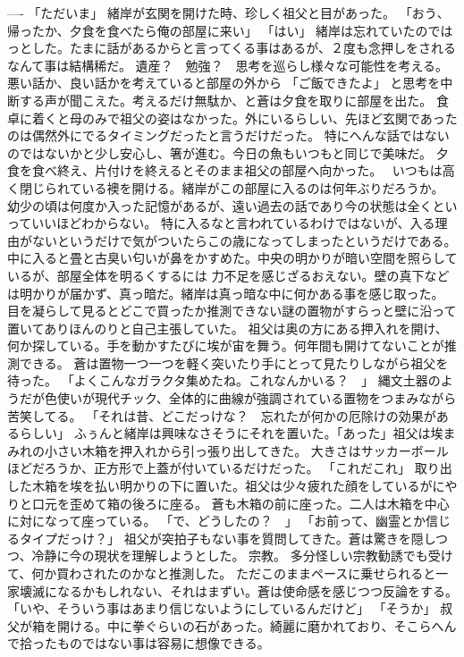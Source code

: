 \documentclass[uplatex]{utbook}
\begin{document}
----
「ただいま」
緒岸が玄関を開けた時、珍しく祖父と目があった。
「おう、帰ったか、夕食を食べたら俺の部屋に来い」
「はい」
緒岸は忘れていたのではっとした。たまに話があるからと言ってくる事はあるが、２度も念押しをされるなんて事は結構稀だ。
遺産？　勉強？　思考を巡らし様々な可能性を考える。悪い話か、良い話かを考えていると部屋の外から
「ご飯できたよ」
と思考を中断する声が聞こえた。考えるだけ無駄か、と蒼は夕食を取りに部屋を出た。
食卓に着くと母のみで祖父の姿はなかった。外にいるらしい、先ほど玄関であったのは偶然外にでるタイミングだったと言うだけだった。
特にへんな話ではないのではないかと少し安心し、箸が進む。今日の魚もいつもと同じで美味だ。
夕食を食べ終え、片付けを終えるとそのまま祖父の部屋へ向かった。　
いつもは高く閉じられている襖を開ける。緒岸がこの部屋に入るのは何年ぶりだろうか。
幼少の頃は何度か入った記憶があるが、遠い過去の話であり今の状態は全くといっていいほどわからない。
特に入るなと言われているわけではないが、入る理由がないというだけで気がついたらこの歳になってしまったというだけである。
中に入ると畳と古臭い匂いが鼻をかすめた。中央の明かりが暗い空間を照らしているが、部屋全体を明るくするには
力不足を感じざるおえない。壁の真下などは明かりが届かず、真っ暗だ。緒岸は真っ暗な中に何かある事を感じ取った。
目を凝らして見るとどこで買ったか推測できない謎の置物がすらっと壁に沿って置いてありほんのりと自己主張していた。
祖父は奥の方にある押入れを開け、何か探している。手を動かすたびに埃が宙を舞う。何年間も開けてないことが推測できる。
蒼は置物一つ一つを軽く突いたり手にとって見たりしながら祖父を待った。
「よくこんなガラクタ集めたね。これなんかいる？　」
縄文土器のようだが色使いが現代チック、全体的に曲線が強調されている置物をつまみながら苦笑してる。
「それは昔、どこだっけな？　忘れたが何かの厄除けの効果があるらしい」
ふぅんと緒岸は興味なさそうにそれを置いた。「あった」祖父は埃まみれの小さい木箱を押入れから引っ張り出してきた。
大きさはサッカーボールほどだろうか、正方形で上蓋が付いているだけだった。
「これだこれ」
取り出した木箱を埃を払い明かりの下に置いた。祖父は少々疲れた顔をしているがにやりと口元を歪めて箱の後ろに座る。
蒼も木箱の前に座った。二人は木箱を中心に対になって座っている。
「で、どうしたの？　」
「お前って、幽霊とか信じるタイプだっけ？」
祖父が突拍子もない事を質問してきた。蒼は驚きを隠しつつ、冷静に今の現状を理解しようとした。
宗教。
多分怪しい宗教勧誘でも受けて、何か買わされたのかなと推測した。
ただこのままペースに乗せられると一家壊滅になるかもしれない、それはまずい。蒼は使命感を感じつつ反論をする。
「いや、そういう事はあまり信じないようにしているんだけど」
「そうか」
叔父が箱を開ける。中に拳ぐらいの石があった。綺麗に磨かれており、そこらへんで拾ったものではない事は容易に想像できる。
\end{document}
